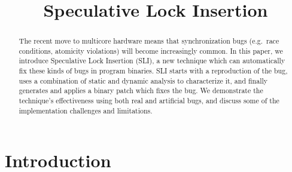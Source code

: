 \documentclass[10pt,twocolumn,preprint,natbib,authoryear]{sigplanconf}
\begin{document}
\copyrightdata{[to be supplied]} 


\title{Speculative Lock Insertion}

\authorinfo{}{}{}

\maketitle

\begin{abstract}

The recent move to multicore hardware means that synchronization bugs
(e.g.\ race conditions, atomicity violations) will become increasingly
common.  In this paper, we introduce Speculative Lock Insertion (SLI),
a new technique which can automatically fix these kinds of bugs in
program binaries. SLI starts with a reproduction of the bug, uses a
combination of static and dynamic analysis to characterize it, and
finally generates and applies a binary patch which fixes the bug. We
demonstrate the technique's effectiveness using both real and
artificial bugs, and discuss some of the implementation challenges and
limitations.

\end{abstract}




\section{Introduction}
\end{document}
